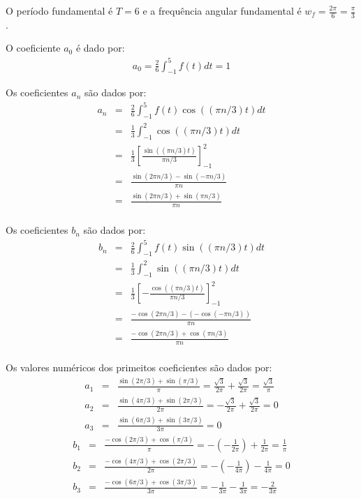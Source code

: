 \begin{resol}

  O período fundamental é $T=6$ e a frequência angular fundamental é $w_f=\frac{2\pi }{6}=\frac{\pi}{3}$. 

  O coeficiente $a_0$ é dado por:
  \begin{eqnarray*}
  a_0=\frac{2}{6}\int_{-1}^5 f(t) dt=1
  \end{eqnarray*}
  
  Os coeficientes $a_n$ são dados por:
  \begin{eqnarray*}
  a_n&=&\frac{2}{6}\int_{-1}^5 f(t)\cos((\pi n/3) t) dt\\
  &=&\frac{1}{3}\int_{-1}^2 \cos((\pi n/3) t) dt\\
  &=&\frac{1}{3}\left[ \frac{\sin((\pi n/3) t)}{\pi n/3} \right]_{-1}^2\\
  &=&\frac{\sin(2\pi n/3)-\sin(-\pi n/3) }{\pi n}\\
  &=&\frac{\sin(2\pi n/3)+\sin(\pi n/3) }{\pi n}\\
  \end{eqnarray*}
  
  Os coeficientes $b_n$ são dados por:
  \begin{eqnarray*}
  b_n&=&\frac{2}{6}\int_{-1}^5 f(t)\sin((\pi n/3) t) dt\\
  &=&\frac{1}{3}\int_{-1}^2 \sin((\pi n/3) t) dt\\
  &=&\frac{1}{3}\left[ -\frac{\cos((\pi n/3) t)}{\pi n/3} \right]_{-1}^2\\
  &=&\frac{-\cos(2\pi n/3)-(-\cos(-\pi n/3)) }{\pi n}\\
  &=&\frac{-\cos(2\pi n/3)+\cos(\pi n/3) }{\pi n}\\
  \end{eqnarray*}
  
  Os valores numéricos dos primeitos coeficientes são dados por:
  \begin{eqnarray*}
  a_1&=&\frac{\sin(2\pi /3)+\sin(\pi /3) }{\pi }=\frac{\sqrt{3}}{2\pi}+\frac{\sqrt{3}}{2\pi}=\frac{\sqrt{3}}{\pi}\\
  a_2&=&\frac{\sin(4\pi /3)+\sin(2\pi /3) }{2\pi }=-\frac{\sqrt{3}}{2\pi}+\frac{\sqrt{3}}{2\pi}=0\\
  a_3&=&\frac{\sin(6\pi /3)+\sin(3\pi /3) }{3\pi }=0
  \end{eqnarray*}
  \begin{eqnarray*}
  b_1&=&\frac{-\cos(2\pi /3)+\cos(\pi /3) }{\pi }=-\left(-\frac{1}{2\pi}\right)+\frac{1}{2\pi}=\frac{1}{\pi}\\
  b_2&=&\frac{-\cos(4\pi /3)+\cos(2\pi /3) }{2\pi }=-\left(-\frac{1}{4\pi}\right)-\frac{1}{4\pi}=0\\
  b_3&=&\frac{-\cos(6\pi /3)+\cos(3\pi /3) }{3\pi }=-\frac{1}{3\pi}-\frac{1}{3\pi}=-\frac{2}{3\pi}
  \end{eqnarray*}


\end{resol}
